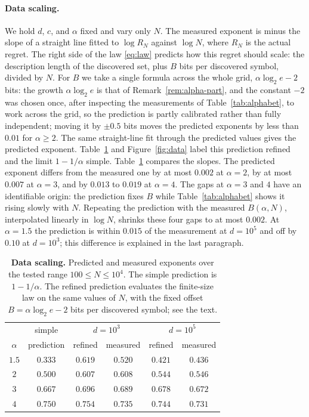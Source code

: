 \documentclass[11pt]{article}
\begin{document}
 \paragraph{Data scaling.}
We hold $d$, $c$, and $\alpha$ fixed and vary only $N$. The measured exponent is minus the
slope of a straight line fitted to $\log R_N$ against $\log N$, where $R_N$ is the actual regret.
The right side of the law \eqref{eq:law} predicts how this regret
should scale: the description length of the discovered set, plus
$B$ bits per discovered symbol, divided by $N$.  For $B$ we take a single formula across the whole grid,
$\alpha\log_2 e - 2$ bits: the growth $\alpha\log_2 e$ is that of
Remark~\ref{rem:alpha-part}, and the constant $-2$ was chosen once,
after inspecting the measurements of Table~\ref{tab:alphabet}, to
work across the grid, so the prediction is partly calibrated rather
than fully independent;
moving it by $\pm 0.5$ bits moves the predicted exponents by less
than $0.01$ for $\alpha \ge 2$. The same straight-line fit through
the predicted values gives the predicted exponent.
Table~\ref{tab:data} and Figure~\ref{fig:data} label this
prediction refined and the limit $1 - 1/\alpha$ simple.
Table~\ref{tab:data} compares the slopes. The predicted exponent
differs from the measured one by at most $0.002$ at $\alpha = 2$,
by at most $0.007$ at $\alpha = 3$, and by $0.013$ to $0.019$ at
$\alpha = 4$. The gaps at $\alpha = 3$ and $4$ have an
identifiable origin: the prediction fixes $B$ while
Table~\ref{tab:alphabet} shows it rising slowly with $N$.
Repeating the prediction with the measured $B(\alpha,N)$,
interpolated linearly in $\log N$, shrinks these four gaps to at most
$0.002$. At $\alpha = 1.5$ the prediction is within $0.015$ of the
measurement at $d = 10^5$ and off by $0.10$ at $d = 10^3$; this difference is explained in the last paragraph.
\begin{table}[htp]
  \centering
  \begin{tabular}{c c cc cc}
    \toprule
    & simple & \multicolumn{2}{c}{\(d=10^3\)}
    & \multicolumn{2}{c}{\(d=10^5\)} \\
    \(\alpha\) & prediction & refined & measured & refined & measured \\
    \midrule
    \(1.5\) & \(0.333\) & \(0.619\) & \(0.520\) & \(0.421\) & \(0.436\) \\
    \(2\)   & \(0.500\) & \(0.607\) & \(0.608\) & \(0.544\) & \(0.546\) \\
    \(3\)   & \(0.667\) & \(0.696\) & \(0.689\) & \(0.678\) & \(0.672\) \\
    \(4\)   & \(0.750\) & \(0.754\) & \(0.735\) & \(0.744\) & \(0.731\) \\
    \bottomrule
  \end{tabular}
  \caption{\textbf{Data scaling.}
  Predicted and measured exponents over the tested range
  \(100\leq N\leq10^4\). The simple prediction is \(1-1/\alpha\).
  The refined prediction evaluates the finite-size law on the same values
  of \(N\), with the fixed offset \(B=\alpha\log_2 e-2\) bits per
  discovered symbol; see the text.}
  \label{tab:data}
\end{table}
\end{document}
